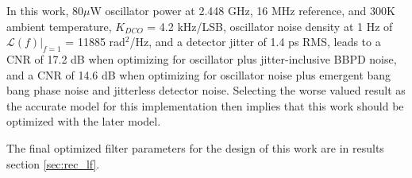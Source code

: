 	In this work, 80$\mu$W oscillator power at 2.448 GHz, 16 MHz reference, and 300K ambient temperature, $K_{DCO}$ = 4.2 kHz/LSB, oscillator noise density at 1 Hz of $\mathcal{L}(f)|_{f=1}$ = 11885 rad$^2$/Hz, and a detector jitter of 1.4 ps RMS, leads to a CNR of 17.2 dB when optimizing for oscillator plus jitter-inclusive BBPD noise, and a CNR of 14.6 dB when optimizing for oscillator noise plus emergent bang bang phase noise and jitterless detector noise. Selecting the worse valued result as the accurate model for this implementation then implies that this work should be optimized with the later model. 

	The final optimized filter parameters for the design of this work are in results section \ref{sec:rec_lf}.





	\FloatBarrier

